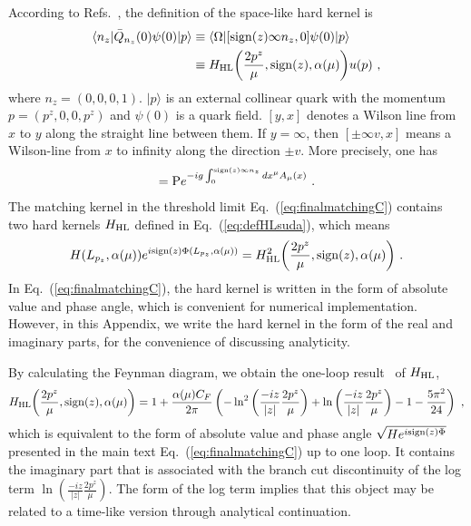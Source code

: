 \documentclass[a4paper,11pt]{article}
\begin{document}
According to Refs.~\cite{Ji:2023pba,Liu:2023onm}, the definition of the space-like hard kernel is
\begin{align}\label{eq:defHLsuda}
\langle n_z|\bar Q_{n_z}(0)\psi(0)|p\rangle &\equiv \langle \Omega| [{\rm sign}(z)\infty n_z,0]\psi(0)|p\rangle \nonumber\\
&\equiv H_{\rm HL}\bigg(\frac{2 p^z}{\mu},{\rm sign}(z),\alpha(\mu)\bigg) u(p) \ ,
\end{align}
where $n_z=(0,0,0,1)$. $|p\rangle$ is an external collinear quark with the momentum $p=(p^z,0,0,p^z)$ and $\psi(0)$ is a quark field. $[y,x]$ denotes a Wilson line from $x$ to $y$ along the straight line between them. If $y=\infty$, then $[ \pm \infty v,x]$ means a Wilson-line from $x$ to infinity along the direction $ \pm v$. More precisely, one has
\begin{align}
[{\rm sign}(z)\infty n_z ,0]={\rm P}e^{-i g \int_{0}^{{\rm sign}(z) \infty n_z } d x^{\mu} A_{\mu}(x)} \ .
\end{align}
The matching kernel in the threshold limit Eq.~(\ref{eq:finalmatchingC}) contains two hard kernels $H_{\rm HL}$ defined in Eq.~(\ref{eq:defHLsuda}), which means 
\begin{align}
H(L_{p_z},\alpha(\mu)) e^{i {\rm sign}(z) \Phi(L_{p_z},\alpha(\mu))} = H_{\rm HL}^2\bigg(\frac{2 p^z}{\mu},{\rm sign}(z),\alpha(\mu)\bigg)    \ .
\end{align}
In Eq.~(\ref{eq:finalmatchingC}), the hard kernel is written in the form of absolute value and phase angle, which is convenient for numerical implementation. However, in this Appendix, we write the hard kernel in the form of the real and imaginary parts, for the convenience of discussing analyticity.  

By calculating the Feynman diagram, we obtain the one-loop result~\cite{Ji:2021znw,Ji:2023pba} of $H_{\rm HL}$,
\begin{align}\label{eq:HL1loop}
H_{\rm HL}\bigg(\frac{2 p^z}{\mu},{\rm sign}(z),\alpha(\mu)\bigg) = 1 + \frac{\alpha(\mu) C_F}{2 \pi} \left( -\ln^2\left( \frac{-i z}{|z|}\frac{2 p^z}{\mu} \right) + \ln\left( \frac{-i z}{|z|}\frac{2 p^z}{\mu} \right) - 1 - \frac{5 \pi^2}{24} \right)    \ ,
\end{align}
which is equivalent to the form of absolute value and phase angle $\sqrt{H e^{i {\rm sign}(z) \Phi}}$ 
presented in the main text Eq.~(\ref{eq:finalmatchingC}) up to one loop. It contains the imaginary part that is associated with the branch cut discontinuity of the log term $\ln\left( \frac{-i z}{|z|}\frac{2 p^z}{\mu} \right)$. The form of the log term implies that this object may be related to a time-like version through analytical continuation. 
\end{document}

